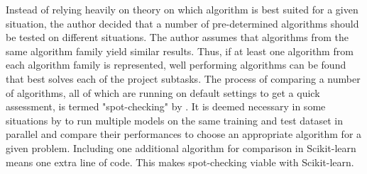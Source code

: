 	Instead of relying heavily on theory on which algorithm is best suited for a given situation, the author decided that a number of pre-determined algorithms should be tested on different situations. The author assumes that algorithms from the same algorithm family yield similar results. Thus, if at least one algorithm from each algorithm family is represented, well performing algorithms can be found that best solves each of the project subtasks. The process of comparing a number of algorithms, all of which are running on default settings to get a quick assessment, is termed "spot-checking" by \cite{WEBSITE:26}. It is deemed necessary in some situations by \cite{BOOK:6} to run multiple models on the same training and test dataset in parallel and compare their performances to choose an appropriate algorithm for a given problem. Including one additional algorithm for comparison in Scikit-learn means one extra line of code. This makes spot-checking viable with Scikit-learn. 

